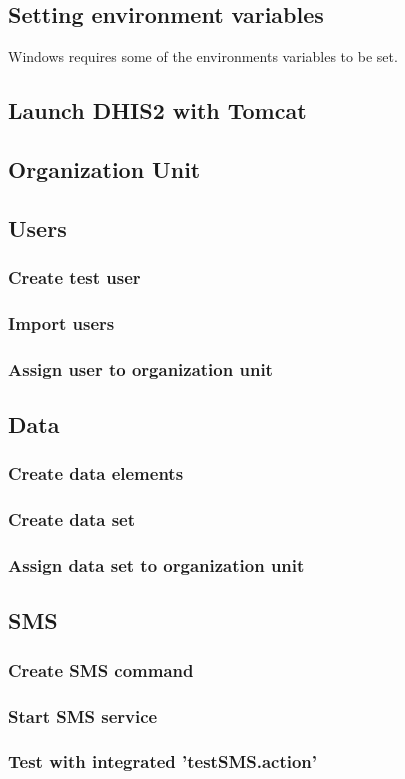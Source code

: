 \documentclass[a4paper, 11pt]{report}
\begin{document}
\subsection{Setting environment variables}
Windows requires some of the environments variables to be set.


\subsection{Launch DHIS2 with Tomcat}

\subsection{Organization Unit}

\subsection{Users}
\subsubsection{Create test user}
\subsubsection{Import users}
\subsubsection{Assign user to organization unit}

\subsection{Data}
\subsubsection{Create data elements}
\subsubsection{Create data set}
\subsubsection{Assign data set to organization unit}


\subsection{SMS}
\subsubsection{Create SMS command}
\subsubsection{Start SMS service}
\subsubsection{Test with integrated 'testSMS.action'}
\end{document}
